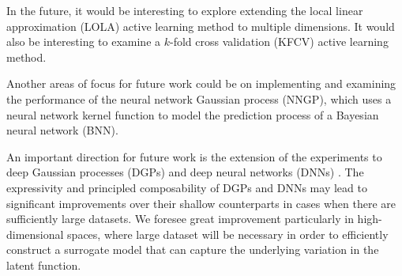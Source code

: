 \documentclass[conference]{IEEEtran}
\begin{document}
	In the future, it would be interesting to explore extending the local linear approximation (LOLA) active learning method to multiple dimensions. It would also be interesting to examine a $k$-fold cross validation (KFCV) active learning method.
	
	Another areas of focus for future work could be on implementing and examining the performance of the neural network Gaussian process (NNGP), which uses a neural network kernel function to model the prediction process of a Bayesian neural network (BNN).
	
	An important direction for future work is the extension of the experiments to deep Gaussian processes (DGPs) and deep neural networks (DNNs) \cite{Damianou2013DeepProcesses}. The expressivity and principled composability of DGPs and DNNs may lead to significant improvements over their shallow counterparts in cases when there are sufficiently large datasets. We foresee great improvement particularly in high-dimensional spaces, where large dataset will be necessary in order to efficiently construct a surrogate model that can capture the underlying variation in the latent function.
	
	
	
	
	
	
\end{document}
